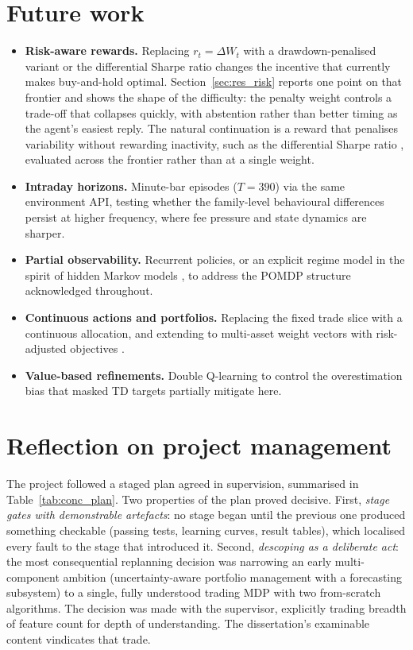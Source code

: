 \section{Future work}
\label{sec:conc_future}

\begin{itemize}
  \item \textbf{Risk-aware rewards.} Replacing $r_t = \Delta W_t$ with a
        drawdown-penalised variant or the differential Sharpe ratio
        \cite{moody2001} changes the incentive that currently makes
        buy-and-hold optimal. Section~\ref{sec:res_risk} reports one point
        on that frontier and shows the shape of the difficulty: the
        penalty weight controls a trade-off that collapses quickly, with
        abstention rather than better timing as the agent's easiest reply.
        The natural continuation is a reward that penalises variability
        without rewarding inactivity, such as the differential Sharpe ratio
        \cite{moody2001}, evaluated across the frontier rather than at a
        single weight.
  \item \textbf{Intraday horizons.} Minute-bar episodes ($T{=}390$) via
        the same environment API, testing whether the family-level
        behavioural differences persist at higher frequency, where
        fee pressure and state dynamics are sharper.
  \item \textbf{Partial observability.} Recurrent policies, or an
        explicit regime model in the spirit of hidden Markov models
        \cite{rabiner1989}, to address the POMDP structure acknowledged
        throughout.
  \item \textbf{Continuous actions and portfolios.} Replacing the fixed
        trade slice with a continuous allocation, and extending to
        multi-asset weight vectors with risk-adjusted objectives
        \cite{markowitz1952, jiang2017}.
  \item \textbf{Value-based refinements.} Double Q-learning
        \cite{vanhasselt2016} to control the overestimation bias that
        masked TD targets partially mitigate here.
\end{itemize}

\section{Reflection on project management}
\label{sec:conc_pm}

The project followed a staged plan agreed in supervision, summarised in
Table~\ref{tab:conc_plan}. Two properties of the plan proved decisive.
First, \emph{stage gates with demonstrable artefacts}: no stage began
until the previous one produced something checkable (passing tests,
learning curves, result tables), which localised every fault to the stage
that introduced it. Second, \emph{descoping as a deliberate act}: the
most consequential replanning decision was narrowing an early
multi-component ambition (uncertainty-aware portfolio management with a
forecasting subsystem) to a single, fully understood trading MDP with two
from-scratch algorithms. The decision was made with the supervisor,
explicitly trading breadth of feature count for depth of understanding.
The dissertation's examinable content vindicates that trade.

